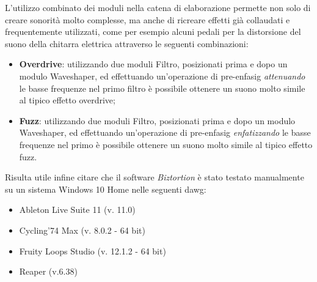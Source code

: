 L'utilizzo combinato dei moduli nella catena di elaborazione permette non solo di creare sonorità molto complesse, ma anche di ricreare effetti già collaudati e frequentemente utilizzati, come per esempio alcuni pedali per la distorsione del suono della chitarra elettrica attraverso le seguenti combinazioni:
\begin{itemize}
    \item \textbf{Overdrive}: utilizzando due moduli Filtro, posizionati prima e dopo un modulo Waveshaper, ed effettuando un'operazione di \gls{pre-enfasig} \textit{attenuando} le basse frequenze nel primo filtro è possibile ottenere un suono molto simile al tipico effetto overdrive;
    \item \textbf{Fuzz}: utilizzando due moduli Filtro, posizionati prima e dopo un modulo Waveshaper, ed effettuando un'operazione di \gls{pre-enfasig} \textit{enfatizzando} le basse frequenze nel primo è possibile ottenere un suono molto simile al tipico effetto fuzz.
\end{itemize}
Risulta utile infine citare che il software \textit{Biztortion} è stato testato manualmente su un sistema Windows 10 Home nelle seguenti \gls{dawg}:
\begin{itemize}
    \item Ableton Live Suite 11 (v. 11.0)
    \item Cycling'74 Max (v. 8.0.2 - 64 bit)
    \item Fruity Loops Studio (v. 12.1.2 - 64 bit)
    \item Reaper (v.6.38)
\end{itemize}